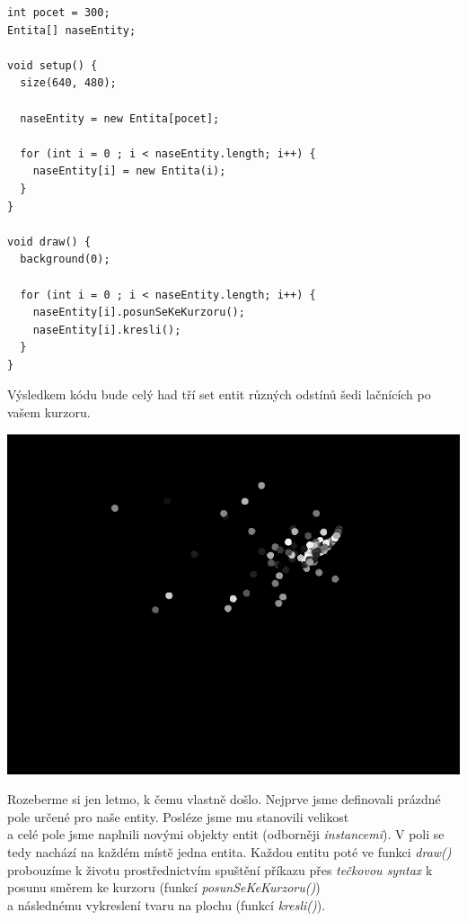 \documentclass[10pt,twoside=true,open=right,cleardoublepage=empty,chapterprefix=true]{scrbook}
\newcommand{\vyraz}[1]{\textit{\gls{#1}}\index{#1}\label{#1}}
\begin{document}
\begin{lstlisting}
int pocet = 300;
Entita[] naseEntity;

void setup() {
  size(640, 480);

  naseEntity = new Entita[pocet]; 

  for (int i = 0 ; i < naseEntity.length; i++) {
    naseEntity[i] = new Entita(i);
  }
}

void draw() {
  background(0);

  for (int i = 0 ; i < naseEntity.length; i++) {
    naseEntity[i].posunSeKeKurzoru();
    naseEntity[i].kresli();
  }
}
\end{lstlisting}

Výsledkem kódu bude celý had tří set entit různých odstínů šedi lačnících po vašem kurzoru.


\begin{center}
\includegraphics[width = 1\textwidth]{imgs/prace-s-objekty-1.png}
\end{center}

Rozeberme si jen letmo, k čemu vlastně došlo. Nejprve jsme definovali prázdné pole určené pro naše entity. Posléze jsme mu stanovili velikost \\a celé pole jsme naplnili novými objekty entit  (odborněji {\em instancemi}). V poli se tedy nachází na každém místě jedna entita. Každou entitu poté ve funkci \vyraz{draw()} probouzíme k životu prostřednictvím spuštění příkazu přes {\em tečkovou syntax} k posunu směrem ke kurzoru (funkcí {\em posunSeKeKurzoru()}) \\a následnému vykreslení tvaru na plochu (funkcí {\em kresli()}).
\end{document}
